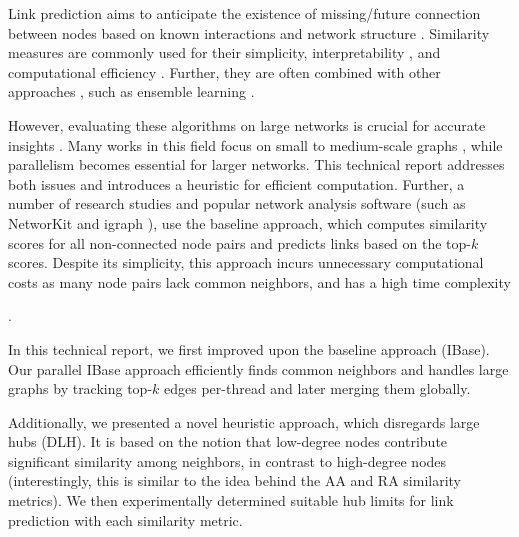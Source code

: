 Link prediction aims to anticipate the existence of missing/future connection between nodes based on known interactions and network structure \cite{arrar2023comprehensive}. Similarity measures are commonly used for their simplicity, interpretability \cite{pai2019netdx, barbieri2014follow}, and computational efficiency \cite{garcia2014link}. Further, they are often combined with other approaches \cite{kumari2022supervised, abuoda2020link, pai2019netdx}, such as ensemble learning \cite{zhou2012ensemble}.

However, evaluating these algorithms on large networks is crucial for accurate insights \cite{zhou2021progresses, zhou2021experimental}. Many works in this field focus on small \cite{guo2019node, rafiee2020cndp, mumin2022efficient, papadimitriou2012fast, vega2021link, saifi2023fast, ferreira2019scalability, benhidour2022approach} to medium-scale graphs \cite{yang2015new, cui2016bounded, kalkanfinding, mohan2017scalable, wang2019link, bastami2019gravitation, shin2012multi, garcia2014link}, while parallelism becomes essential for larger networks. This technical report addresses both issues and introduces a heuristic for efficient computation. Further, a number of research studies \cite{gatadi2023lpcd, saifi2023fast, benhidour2022approach, mumin2022efficient, rafiee2020cndp, guo2019node, yang2015new, papadimitriou2012fast, wang2019link} and popular network analysis software (such as NetworKit \cite{staudt2016networkit} and igraph \cite{csardi2006igraph}), use the baseline approach, which computes similarity scores for all non-connected node pairs and predicts links based on the top-$k$ scores. Despite its simplicity, this approach incurs unnecessary computational costs as many node pairs lack common neighbors, and has a high time complexity.

In this technical report, we first improved upon the baseline approach (IBase). Our parallel IBase approach efficiently finds common neighbors and handles large graphs by tracking top-$k$ edges per-thread and later merging them globally. Additionally, we presented a novel heuristic approach, which disregards large hubs (DLH). It is based on the notion that low-degree nodes contribute significant similarity among neighbors, in contrast to high-degree nodes (interestingly, this is similar to the idea behind the AA and RA similarity metrics). We then experimentally determined suitable hub limits for link prediction with each similarity metric.


